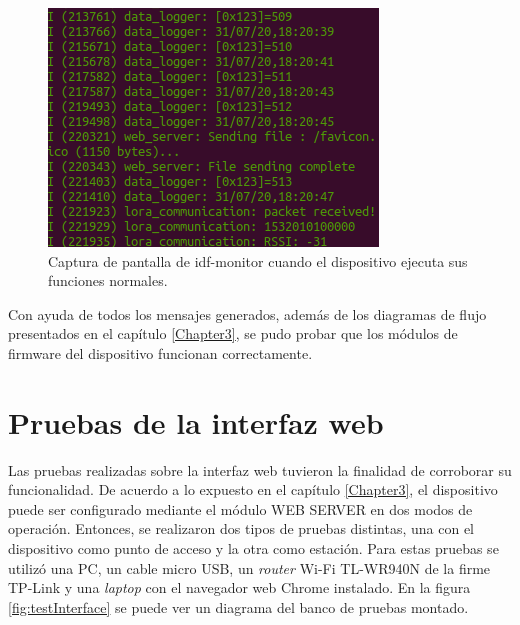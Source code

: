 \begin{figure}[ht]
	\centering
	\includegraphics[scale=0.55]{./Figures/test_firmware_tasks.png}
	\caption{Captura de pantalla de idf-monitor cuando el dispositivo ejecuta sus funciones normales.}
	\label{fig:testIDF2}
\end{figure}

Con ayuda de todos los mensajes generados, además de los diagramas de flujo presentados en el capítulo \ref{Chapter3}, se pudo probar que los módulos de firmware del dispositivo funcionan correctamente.


\section{Pruebas de la interfaz web}

Las pruebas realizadas sobre la interfaz web tuvieron la finalidad de corroborar su funcionalidad. De acuerdo a lo expuesto en el capítulo \ref{Chapter3}, el dispositivo puede ser configurado mediante el módulo WEB SERVER en dos modos de operación. Entonces, se realizaron dos tipos de pruebas distintas, una con el dispositivo como punto de acceso y la otra como estación. Para estas pruebas se utilizó una PC, un cable micro USB, un \textit{router} Wi-Fi TL-WR940N de la firme TP-Link y una \textit{laptop} con el navegador web Chrome instalado. En la figura \ref{fig:testInterface} se puede ver un diagrama del banco de pruebas montado.

